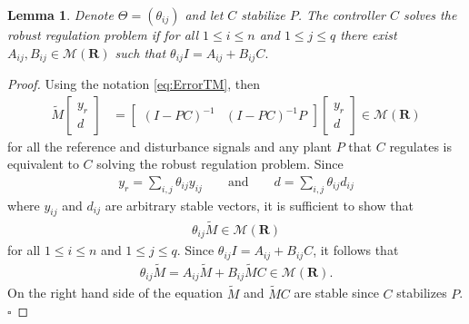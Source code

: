 \documentclass[11pt, a4paper]{amsart}
\newcommand{\inv}{^{-1}}
\newtheorem{lemma}[theorem]{Lemma}
\newcommand{\matrices}[1]{\mathcal{M}\left( #1 \right)}		%
\newcommand{\measurement}{y}								%
\newcommand{\reference}{\measurement_r}						%
\newcommand{\disturbance}{d}								%
\newcommand{\Plant}{P}										%
\newcommand{\Cont}{C}										%
\newcommand{\Gen}{\Theta}									%
\newcommand{\gen}{\theta}									%
\newcommand{\outd}{n}										%
\newcommand{\stable}{\mathbf{R}}							%
\begin{document}
\begin{lemma}\label{lem:IMP1}
Denote $\Gen=(\gen_{ij})$ and let $\Cont$ stabilize $\Plant$. The controller $\Cont$ solves the robust regulation problem if for all $1\leq i\leq \outd$ and $1\leq j\leq q$ there exist $A_{ij},B_{ij}\in\matrices{\stable}$ such that 
$ %
\gen_{ij} I=A_{ij}+B_{ij}\Cont.
$
\end{lemma}
\begin{proof}
Using the notation \eqref{eq:ErrorTM}, then 
\begin{align*}
\widetilde{M} \begin{bmatrix}
\reference \\ \disturbance
\end{bmatrix}&
=\begin{bmatrix}
\left(I-\Plant\Cont\right)\inv  & \left(I-\Plant\Cont\right)\inv \Plant
\end{bmatrix}
\begin{bmatrix}
\reference \\ \disturbance
\end{bmatrix}
\in\matrices{\stable}
\end{align*}
for all the reference and disturbance signals and any plant $\Plant$ that $\Cont$ regulates is equivalent to $\Cont$ solving the robust regulation problem. Since
\begin{align*}
\reference=\sum_{i,j}\gen_{ij}\measurement_{ij} \qquad\text{and}\qquad \disturbance=\sum_{i,j}\gen_{ij}\disturbance_{ij}
\end{align*}
where $\measurement_{ij}$ and $\disturbance_{ij}$ are arbitrary stable vectors, it is sufficient to show that
\begin{align*}
\gen_{ij}\widetilde{M}
\in\matrices{\stable}
\end{align*}
for all $1\leq i\leq \outd$ and $1\leq j\leq q$. Since $\gen_{ij}I=A_{ij}+B_{ij}\Cont$, it follows that
\begin{align*}
\gen_{ij}\widetilde{M}
 =A_{ij}\widetilde{M}+B_{ij}\widetilde{M}\Cont\in\matrices{\stable}.
\end{align*}
On the right hand side of the equation $\widetilde{M}$ and $\widetilde{M}\Cont$ are stable since $\Cont$ stabilizes $\Plant$.\hfill$\square$
\end{proof}
\end{document}
